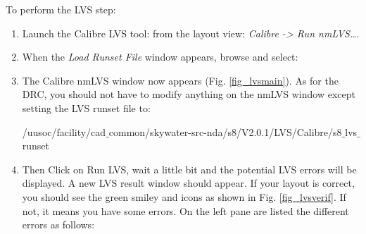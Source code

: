 \parbox[t]{\dimexpr\textwidth-\leftmargin}{%
	To perform the LVS step:
	\begin{enumerate}
		\item Launch the Calibre LVS tool: from the layout view: \textit{Calibre -> Run nmLVS…}.
		\item When the \textit{Load Runset File} window appears, browse and select: 
		\item The Calibre nmLVS window now appears (Fig. \ref{fig_lvsmain}). As for the DRC, you should not have to modify anything on the nmLVS window except setting the LVS runset file to:
		
		\begin{codeline}
			/uusoc/facility/cad$\_$common/skywater-src-nda/s8/V2.0.1/LVS/Calibre/s8$\_$lvs$\_$runset
		\end{codeline}

		\item Then Click on Run LVS, wait a little bit and the potential LVS errors will be displayed. A new LVS result window should appear. If your layout is correct, you should see the green smiley and icons as shown in Fig. \ref{fig_lvsverif}. If not, it means you have some errors. On the left pane are listed the different errors as follows:
\end{enumerate}}


